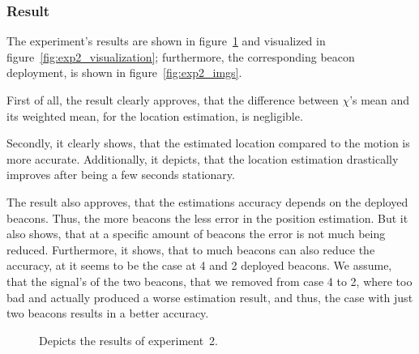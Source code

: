 \subsubsection*{Result}
The experiment's results are shown in figure~\ref{fig:exp2_results} and visualized in figure~\ref{fig:exp2_visualization}; furthermore, the corresponding beacon deployment, is shown in figure~\ref{fig:exp2_imgs}.

First of all, the result clearly approves, that the difference between $\chi$'s mean and its weighted mean, for the location estimation, is negligible.

Secondly, it clearly shows, that the estimated location compared to the motion is more accurate. Additionally, it depicts, that the location estimation drastically improves after being a few seconds stationary.

The result also approves, that the estimations accuracy depends on the deployed beacons. Thus, the more beacons the less error in the position estimation. But it also shows, that at a specific amount of beacons the error is not much being reduced. Furthermore, it shows, that to much beacons can also reduce the accuracy, at it seems to be the case at 4 and 2 deployed beacons. We assume, that the signal's of the two beacons, that we removed from case 4 to 2, where too bad and actually produced a worse estimation result, and thus, the case with just two beacons results in a better accuracy.

\begin{figure}

\caption{Depicts the results of experiment~2.}
\label{fig:exp2_results}
\end{figure}

